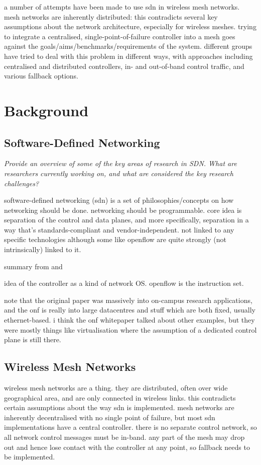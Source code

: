 \documentclass[pdftex,12pt,a4paper]{article}
\begin{document}
a number of attempts have been made to use sdn in wireless mesh networks. mesh networks are inherently distributed: this contradicts several key assumptions about the network architecture, especially for wireless meshes. trying to integrate a centralised, single-point-of-failure controller into a mesh goes against the goals/aims/benchmarks/requirements of the system. different groups have tried to deal with this problem in different ways, with approaches including centralised and distributed controllers, in- and out-of-band control traffic, and various fallback options.

\newpage
\section{Background}
\subsection{Software-Defined Networking}
\emph{Provide an overview of some of the key areas of research in SDN. What are researchers currently working on, and what are considered the key research challenges?}

software-defined networking (sdn) is a set of philosophies/concepts on how networking should be done. networking should be programmable. core idea is separation of the control and data planes, and more specifically, separation in a way that's standards-compliant and vendor-independent. \cite{onf:sdn} not linked to any specific technologies although some like openflow are quite strongly (not intrinsically) linked to it. 

summary from \cite{onf:sdn} and \cite{mckeown:campus}

idea of the controller as a kind of network OS. openflow is the instruction set. 

note that the original paper \cite{mckeown:campus} was massively into on-campus research applications, and the onf is really into large datacentres and stuff \cite{onf:sdn} which are both fixed, usually ethernet-based. i think the onf whitepaper talked about other examples, but they were mostly things like virtualisation where the assumption of a dedicated control plane is still there.

\subsection{Wireless Mesh Networks}
wireless mesh networks are a thing. they are distributed, often over wide geographical area, and are only connected in wireless links. this contradicts certain assumptions about the way sdn is implemented. mesh networks are inherently decentralised with no single point of failure, but most sdn implementations have a central controller. there is no separate control network, so all network control messages must be in-band. any part of the mesh may drop out and hence lose contact with the controller at any point, so fallback needs to be implemented.
\end{document}
